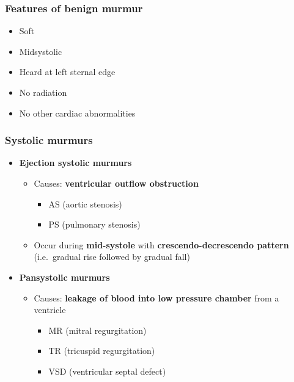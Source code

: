 \documentclass[
  12pt,
]{memoir}
\providecommand{\tightlist}{%
  \setlength{\itemsep}{0pt}\setlength{\parskip}{0pt}}
\begin{document}
\hypertarget{features-of-benign-murmur}{%
\subsubsection{Features of benign
murmur}\label{features-of-benign-murmur}}

\begin{itemize}
\tightlist
\item
  Soft
\item
  Midsystolic
\item
  Heard at left sternal edge
\item
  No radiation
\item
  No other cardiac abnormalities
\end{itemize}

\hypertarget{systolic-murmurs}{%
\subsubsection{Systolic murmurs}\label{systolic-murmurs}}

\begin{itemize}
\tightlist
\item
  \textbf{Ejection systolic murmurs}

  \begin{itemize}
  \tightlist
  \item
    Causes: \textbf{ventricular outflow obstruction}

    \begin{itemize}
    \tightlist
    \item
      AS (aortic stenosis)
    \item
      PS (pulmonary stenosis)
    \end{itemize}
  \item
    Occur during \textbf{mid-systole} with \textbf{crescendo-decrescendo
    pattern} (i.e.~gradual rise followed by gradual fall)
  \end{itemize}
\item
  \textbf{Pansystolic murmurs}

  \begin{itemize}
  \tightlist
  \item
    Causes: \textbf{leakage of blood into low pressure chamber} from a
    ventricle

    \begin{itemize}
    \tightlist
    \item
      MR (mitral regurgitation)
    \item
      TR (tricuspid regurgitation)
    \item
      VSD (ventricular septal defect)
    \end{itemize}
  \end{itemize}
\end{itemize}
\end{document}
